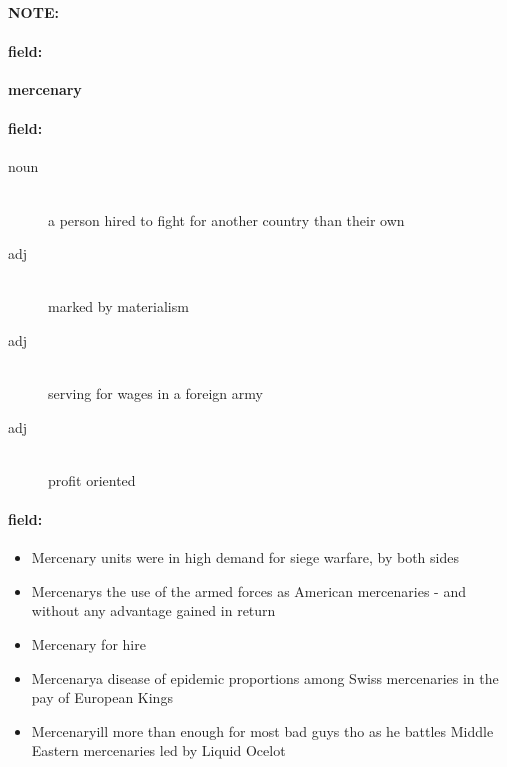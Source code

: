 \documentclass[12pt]{article}
\newenvironment{note}{\paragraph{NOTE:}}{}
\newenvironment{field}{\paragraph{field:}}{}
\begin{document}
\begin{note}
\begin{field}
\textbf{\large mercenary}
\end{field}


\begin{field}
\begin{description}
\item[noun] \hfill \\ 
a person hired to fight for another country than their own

\item[adj] \hfill \\ 
marked by materialism

\item[adj] \hfill \\ 
serving for wages in a foreign army

\item[adj] \hfill \\ 
profit oriented

\end{description}
\end{field}

\begin{field}
\begin{itemize}
\item Mercenary units were in high demand for siege warfare, by both sides
\item Mercenarys the use of the armed forces as American mercenaries - and without any advantage gained in return
\item Mercenary for hire
\item Mercenarya disease of epidemic proportions among Swiss mercenaries in the pay of European Kings
\item Mercenaryill more than enough for most bad guys tho as he battles Middle Eastern mercenaries led by Liquid Ocelot
\end{itemize}
\end{field}
\end{note}
\end{document}

